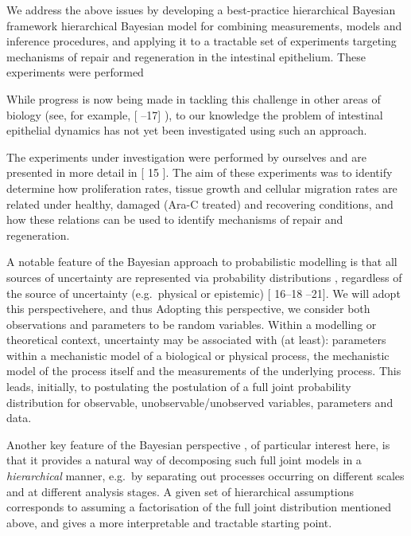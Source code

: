 \documentclass[10pt,letterpaper]{article}
\providecommand{\DIFaddtex}[1]{{\protect\color{blue} \sf #1}} %
\providecommand{\DIFdeltex}[1]{{\protect\color{red} \scriptsize #1}} %
\providecommand{\DIFaddbegin}{} %
\providecommand{\DIFaddend}{} %
\providecommand{\DIFdelbegin}{} %
\providecommand{\DIFdelend}{} %
\providecommand{\DIFadd}[1]{\texorpdfstring{\DIFaddtex{#1}}{#1}} %
\providecommand{\DIFdel}[1]{\texorpdfstring{\DIFdeltex{#1}}{}} %
\begin{document}
We address the above issues by developing a \DIFdelbegin \DIFdel{best-practice hierarchical Bayesian framework }\DIFdelend \DIFaddbegin \DIFadd{hierarchical Bayesian model
}\DIFaddend for combining measurements, models and inference procedures, and
applying it to a \DIFdelbegin \DIFdel{tractable }\DIFdelend set of experiments targeting mechanisms of repair and
regeneration in the intestinal epithelium.
\DIFdelbegin \DIFdel{These experiments were performed }\DIFdelend \DIFaddbegin 

\DIFadd{While progress is now being made in tackling this challenge in other
areas of biology (see, for example, }{[}\DIFadd{15--17}{]}\DIFadd{), to our knowledge the
problem of intestinal epithelial dynamics has not yet been investigated
using such an approach.
}

\DIFadd{The experiments under investigation were performed by }\DIFaddend ourselves and are
presented in more detail in {[}\DIFdelbegin \DIFdel{15}\DIFdelend \DIFaddbegin \DIFadd{18}\DIFaddend {]}. The aim of these experiments was
to \DIFdelbegin \DIFdel{identify }\DIFdelend \DIFaddbegin \DIFadd{determine }\DIFaddend how proliferation rates, tissue growth and cellular
migration rates are related under healthy, damaged (Ara-C treated) and
recovering conditions, and how these relations can be used to identify
mechanisms of repair and regeneration.

A notable feature of the Bayesian approach to probabilistic modelling is
that all sources of uncertainty are represented via probability
distributions \DIFdelbegin \DIFdel{, regardless of the source of uncertainty (e.g.~physical or
epistemic) }\DIFdelend {[}\DIFdelbegin \DIFdel{16--18}\DIFdelend \DIFaddbegin \DIFadd{19--21}\DIFaddend {]}. \DIFdelbegin \DIFdel{We will adopt this perspectivehere, and thus
}\DIFdelend \DIFaddbegin \DIFadd{Adopting this perspective, }\DIFaddend we consider both
observations and parameters to be random variables. Within a modelling
\DIFdelbegin \DIFdel{or theoretical }\DIFdelend context, uncertainty may be associated with (at least): parameters
within a mechanistic model of a biological or physical process, the
mechanistic model of the process itself and the measurements of the
underlying process. This leads, initially, to \DIFdelbegin \DIFdel{postulating }\DIFdelend \DIFaddbegin \DIFadd{the postulation of }\DIFaddend a full
joint probability distribution for observable, unobservable/unobserved
variables, parameters and data.

Another key feature of the Bayesian perspective \DIFdelbegin \DIFdel{, of particular interest
here, }\DIFdelend is that it provides a
natural way of decomposing such full joint models in a
\emph{hierarchical} manner, e.g.~by separating out processes occurring
on different scales and at different analysis stages. A given set of
hierarchical assumptions corresponds to assuming a factorisation of the
full joint distribution mentioned above, and gives a more interpretable
and tractable starting point.
\end{document}

